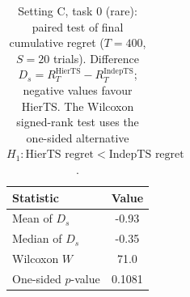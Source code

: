 \begin{table}[ht]
\centering
\caption{Setting C, task 0 (rare): paired test of final cumulative regret
($T=400$, $S=20$ trials). Difference $D_s = R_T^{\text{HierTS}} - R_T^{\text{IndepTS}}$;
negative values favour HierTS. The Wilcoxon signed-rank test uses the one-sided
alternative $H_1: \text{HierTS regret} < \text{IndepTS regret}$.}
\label{tab:per_task_test}
\begin{tabular}{lc}
\toprule
Statistic & Value \\
\midrule
Mean of $D_s$ & -0.93 \\
Median of $D_s$ & -0.35 \\
Wilcoxon $W$ & 71.0 \\
One-sided $p$-value & 0.1081 \\
\bottomrule
\end{tabular}
\end{table}
